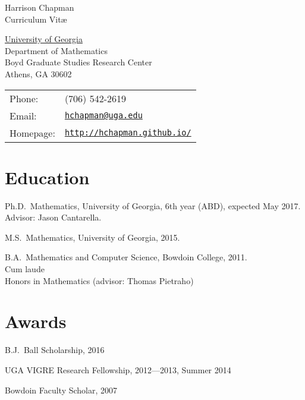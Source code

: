\documentclass[letterpaper]{article}
\def\name{Harrison Chapman}
\renewenvironment{itemize}{
  \begin{list}{}{
    \setlength{\leftmargin}{1.5em}
  }
}{
  \end{list}
}
\begin{document}
{\huge \name}\\
{\large\sc Curriculum Vit\ae}


\vspace{0.25in}

\begin{minipage}{0.45\linewidth}
  \href{http://www.uga.edu/}{University of Georgia} \\
  Department of Mathematics \\
  Boyd Graduate Studies Research Center \\
  Athens, GA 30602
\end{minipage}
\begin{minipage}{0.45\linewidth}
  \begin{tabular}{ll}
    Phone: & (706) 542-2619 \\
    Email: & \href{mailto:hchapman@uga.edu}{\tt hchapman@uga.edu} \\
    Homepage: & \href{http://hchapman.github.io/}{\tt http://hchapman.github.io/} \\
  \end{tabular}
\end{minipage}

\section*{Education}

\begin{itemize}
\item Ph.D.\ Mathematics, University of Georgia, 6th year (ABD), expected May
  2017.\\
  \textbullet \quad Advisor: Jason Cantarella.
\item M.S.\ Mathematics, University of Georgia, 2015.
\item B.A.\ Mathematics and Computer Science, Bowdoin College,
  2011.\\
  \textbullet \quad Cum laude \\
  \textbullet \quad Honors in Mathematics (advisor: Thomas Pietraho)
\end{itemize}

 \section*{Awards}

 \begin{itemize}
 \item B.J.\ Ball Scholarship, 2016
 \item UGA VIGRE Research Fellowship, 2012---2013, Summer 2014
 \item Bowdoin Faculty Scholar, 2007
 \end{itemize}
\end{document}
